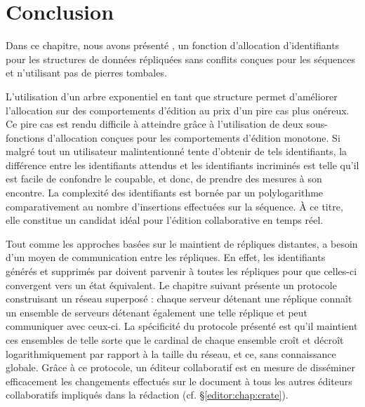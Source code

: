 
\section{Conclusion}
\label{repl:sec:conclusion}

Dans ce chapitre, nous avons présenté \LSEQ, un fonction d'allocation
d'identifiants pour les structures de données répliquées sans conflits conçues
pour les séquences et n'utilisant pas de pierres tombales.

L'utilisation d'un arbre exponentiel en tant que structure permet d'améliorer
l'allocation sur des comportements d'édition au prix d'un pire cas plus
onéreux. Ce pire cas est rendu difficile à atteindre grâce à l'utilisation de
deux sous-fonctions d'allocation conçues pour les comportements d'édition
monotone. Si malgré tout un utilisateur malintentionné tente d'obtenir de tels
identifiants, la différence entre les identifiants attendus et les identifiants
incriminés est telle qu'il est facile de confondre le coupable, et donc, de
prendre des mesures à son encontre. La complexité des identifiants \LSEQ est
bornée par un polylogarithme comparativement au nombre d'insertions effectuées
sur la séquence. À ce titre, elle constitue un candidat idéal pour l'édition
collaborative en temps réel.

Tout comme les approches basées sur le maintient de répliques distantes, \LSEQ a
besoin d'un moyen de communication entre les répliques. En effet, les
identifiants générés et supprimés par \LSEQ doivent parvenir à toutes les
répliques pour que celles-ci convergent vers un état équivalent.  Le chapitre
suivant présente un protocole construisant un réseau superposé : chaque serveur
détenant une réplique connaît un ensemble de serveurs détenant également une
telle réplique et peut communiquer avec ceux-ci. La spécificité du protocole
présenté est qu'il maintient ces ensembles de telle sorte que le cardinal de
chaque ensemble croît et décroît logarithmiquement par rapport à la taille du
réseau, et ce, sans connaissance globale. Grâce à ce protocole, un éditeur
collaboratif est en mesure de disséminer efficacement les changements effectués
sur le document à tous les autres éditeurs collaboratifs impliqués dans la
rédaction (cf. §\ref{editor:chap:crate}).


